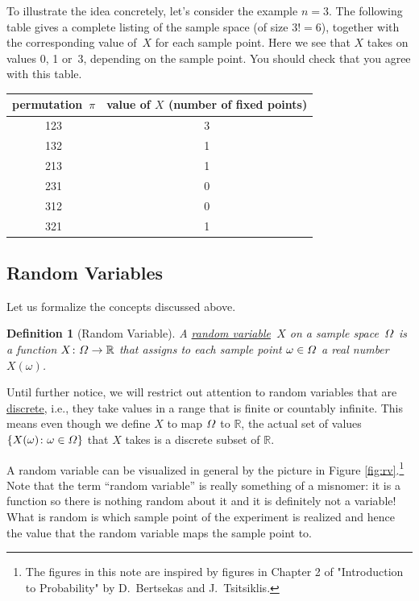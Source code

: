 \documentclass[11pt]{article}
\def\ul#1{\underline{#1}}
\def\Omega{\mathchar"10A }
\def\Omega{\mathchar"10A }
\newcounter{thm}
\newtheorem{definition}{Definition}[thm]
\begin{document}
To illustrate the idea concretely, let's consider the example $n = 3$. The following
table gives a complete listing of the sample space (of size $3!=6$),
together with the corresponding value of~$X$ for each sample point. Here we see that
$X$ takes on values 0, 1 or~3, depending on the sample point.
You should check that you agree with this table.
\begin{center}\begin{tabular}{|c|c|}
\hline
permutation~$\pi$&value of $X$ (number of fixed points) \\\hline
123&3\\
132&1\\
213&1\\
231&0\\
312&0\\
321&1\\\hline
\end{tabular}\end{center}





\subsection*{Random Variables}
Let us formalize the concepts discussed above.

\begin{definition}[Random Variable]
A \ul{random variable}~$X$ on a sample space~$\Omega$ is a function
$X \colon \Omega \to \mathbb{R}$ that assigns to each sample point $\omega\in\Omega$
a real number~$X(\omega)$.
\end{definition}

Until further notice, we will restrict out attention to random variables
that are \ul{discrete}, i.e., they take values in a range that is finite
or countably infinite. This means even though we define $X$ to map $\Omega$ to $\mathbb{R}$,
the actual set of values $\{X(\omega) \colon \omega \in \Omega\}$ that $X$ takes is a discrete subset of $\mathbb{R}$.



A random variable can be visualized in general by the picture in Figure \ref{fig:rv}.\footnote{The figures in this note are inspired by figures in Chapter 2 of "Introduction to Probability" by D.~Bertsekas and J.~Tsitsiklis.} Note that the term ``random variable'' is really something of a misnomer: it is a function so there is nothing random about it and it is definitely not a variable! What is random is which sample point of the experiment is realized and hence the value that the random variable maps the sample point to.
 
\end{document}
